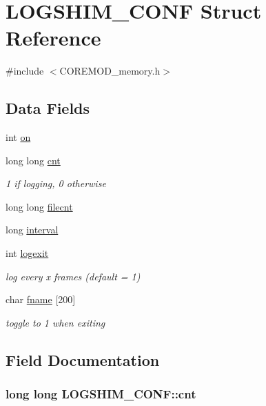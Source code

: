 \hypertarget{structLOGSHIM__CONF}{\section{L\+O\+G\+S\+H\+I\+M\+\_\+\+C\+O\+N\+F Struct Reference}
\label{structLOGSHIM__CONF}
}


{\ttfamily \#include $<$C\+O\+R\+E\+M\+O\+D\+\_\+memory.\+h$>$}

\subsection*{Data Fields}
\begin{DoxyCompactItemize}
\item 
int \hyperlink{structLOGSHIM__CONF_a399b782abca4a24ae8e5a3c11ac9bc48}{on}
\item 
long long \hyperlink{structLOGSHIM__CONF_af89423462a4010b5213f9687f354a548}{cnt}
\begin{DoxyCompactList}\small\item\em 1 if logging, 0 otherwise \end{DoxyCompactList}\item 
long long \hyperlink{structLOGSHIM__CONF_a540e125719be22adb4d4d1c1c87f575d}{filecnt}
\item 
long \hyperlink{structLOGSHIM__CONF_af4a9410a1d66d15e10df76223aeccb50}{interval}
\item 
int \hyperlink{structLOGSHIM__CONF_ade9849e9a2d4a6973b891d0ba46724ed}{logexit}
\begin{DoxyCompactList}\small\item\em log every x frames (default = 1) \end{DoxyCompactList}\item 
char \hyperlink{structLOGSHIM__CONF_aa4b09441bd4b5c40b120b76c075d595d}{fname} \mbox{[}200\mbox{]}
\begin{DoxyCompactList}\small\item\em toggle to 1 when exiting \end{DoxyCompactList}\end{DoxyCompactItemize}


\subsection{Field Documentation}
\hypertarget{structLOGSHIM__CONF_af89423462a4010b5213f9687f354a548}{
\subsubsection[{cnt}]{\setlength{\rightskip}{0pt plus 5cm}long long L\+O\+G\+S\+H\+I\+M\+\_\+\+C\+O\+N\+F\+::cnt}}\label{structLOGSHIM__CONF_af89423462a4010b5213f9687f354a548}


